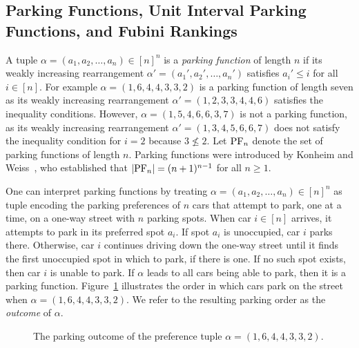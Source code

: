 \documentclass[11pt,reqno]{amsart}
\theoremstyle{definition}
\theoremstyle{notation}
\theoremstyle{openproblem}
\newcommand{\PF}{\textnormal{PF}}
\begin{document}
\subsection{Parking Functions, Unit Interval Parking Functions, and Fubini Rankings}

A tuple $\alpha=(a_1,a_2,\ldots,a_n)\in[n]^n$ is a \emph{parking function} of length $n$ if its weakly increasing rearrangement $\alpha'=(a_1',a_2',\ldots,a_n')$ satisfies $a_i'\leq i$ for all $i\in[n]$. 
For example $\alpha=(1,6,4,4,3,3,2)$ is a parking function of length seven as its weakly increasing rearrangement $\alpha'=(1,2,3,3,4,4,6)$ satisfies the inequality conditions.
However, $\alpha=(1,5,4,6,6,3,7)$ is not a parking function, as its weakly increasing rearrangement 
$\alpha'=(1,3,4,5,6,6,7)$ does not satisfy the inequality condition for $i=2$ because $3\nleq 2$.
Let $\PF_n$ denote the set of parking functions of length $n$.
Parking functions were introduced by Konheim and Weiss~\cite{Konheim_Weiss}, who established that $|\PF_n|=(n+1)^{n-1}$ for all $n \geq 1$.

One can interpret parking functions by treating $\alpha=(a_1,a_2,\ldots,a_n)\in[n]^n$ as tuple encoding the parking preferences of $n$ cars that attempt to park, one at a time, on a one-way street with $n$ parking spots. 
When car $i \in [n]$ arrives, it attempts to park in its preferred spot $a_i$.
If spot $a_i$ is unoccupied, car $i$ parks there.
Otherwise, car $i$ continues driving down the one-way street until it finds the first unoccupied spot in which to park, if there is one.
If no such spot exists, then car $i$ is unable to park.
If $\alpha$ leads to all cars being able to park, then it is a parking function.
Figure~\ref{fig: parking} illustrates the order in which cars park on the street when $\alpha=(1,6,4,4,3,3,2)$. 
We refer to the resulting parking order as the \emph{outcome} of $\alpha$. 

\begin{figure}[h]
    \centering
    \caption{The parking outcome of the preference tuple $\alpha=(1,6,4,4,3,3,2)$.
}
    \label{fig: parking}
\end{figure}
\end{document}
